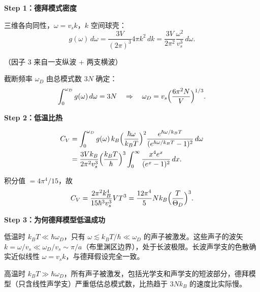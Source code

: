 \begin{derivationbox}
\textbf{Step 1：德拜模式密度}

三维各向同性，$\omega=v_s k$，$k$ 空间球壳：
\[
g(\omega)\,d\omega=\frac{3V}{(2\pi)^3}4\pi k^2\,dk=\frac{3V}{2\pi^2}\frac{\omega^2}{v_s^3}\,d\omega.
\]

（因子 3 来自一支纵波 + 两支横波）

截断频率 $\omega_D$ 由总模式数 $3N$ 确定：
\[
\int_0^{\omega_D}g(\omega)\,d\omega=3N\quad\Rightarrow\quad
\omega_D=v_s\Bigl(\frac{6\pi^2N}{V}\Bigr)^{1/3}.
\]

\textbf{Step 2：低温比热}

\begin{align*}
C_V&=\int_0^{\omega_D}g(\omega)\,k_B\Bigl(\frac{\hbar\omega}{k_BT}\Bigr)^2\frac{e^{\hbar\omega/k_BT}}{(e^{\hbar\omega/k_BT}-1)^2}\,d\omega\\
&=\frac{3Vk_B}{2\pi^2v_s^3}\Bigl(\frac{k_BT}{\hbar}\Bigr)^3\int_0^{\infty}\frac{x^4e^x}{(e^x-1)^2}\,dx.
\end{align*}

积分值 $=4\pi^4/15$，故
\[
C_V=\frac{2\pi^2k_B^4}{15\hbar^3v_s^3}VT^3=\frac{12\pi^4}{5}Nk_B\Bigl(\frac{T}{\Theta_D}\Bigr)^3.
\]

\textbf{Step 3：为何德拜模型低温成功}

低温时 $k_BT\ll\hbar\omega_D$，只有 $\omega\lesssim k_BT/\hbar\ll\omega_D$ 的声子被激发。这些声子的波矢 $k=\omega/v_s\ll\omega_D/v_s\sim\pi/a$（布里渊区边界），处于长波极限。长波声学支的色散确实近似线性 $\omega=v_s k$，与德拜假设完全一致。

高温时 $k_BT\gg\hbar\omega_D$，所有声子被激发，包括光学支和声学支的短波部分，德拜模型（只含线性声学支）严重低估总模式数，比热趋于 $3Nk_B$ 的速度比实际慢。
\end{derivationbox}

\vspace{1em}
